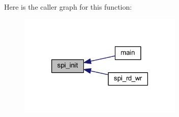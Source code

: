 Here is the caller graph for this function\-:\nopagebreak
\begin{figure}[H]
\begin{center}
\leavevmode
\includegraphics[width=222pt]{d0/d0b/a00004_ga96ddfd5c89b80852982ba50dd18256f6_icgraph}
\end{center}
\end{figure}


